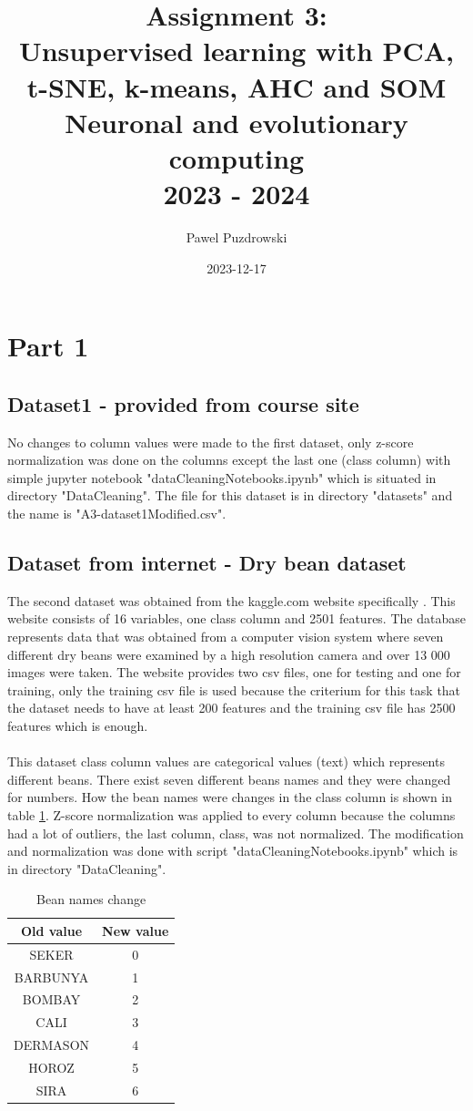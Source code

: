 \documentclass[12pt]{report}
\title{Assignment 3: \\ Unsupervised learning with
	PCA, t-SNE, k-means, AHC and SOM\\ Neuronal and evolutionary computing\\ 2023 - 2024}
\author{Pawel Puzdrowski}
\date{2023-12-17}
\begin{document}
	\maketitle
	\tableofcontents
	\newpage
	\section{Part 1}
	\subsection{Dataset1 - provided from course site}
	No changes to column values were made to the first dataset, only z-score normalization was done on the columns except the last one (class column) with simple jupyter notebook "dataCleaningNotebooks.ipynb" which is situated in directory "DataCleaning". The file for this dataset is in directory "datasets" and the name is "A3-dataset1Modified.csv". 
	\subsection{Dataset from internet - Dry bean dataset}
	The second dataset was obtained from the kaggle.com website specifically \cite{DatasetDryBeans}. This website consists of 16 variables, one class column and 2501 features. The database represents data that was obtained from a computer vision system where seven different dry beans were examined by a high resolution camera and over 13 000 images were taken. The website provides two csv files, one for testing and one for training, only the training csv file is used because the criterium for this task that the dataset needs to have at least 200 features and the training csv file has 2500 features which is enough. \\
	\\
	This dataset class column values are categorical values (text) which represents different beans. There exist seven different beans names and they were changed for numbers. How the bean names were changes in the class column is shown in table \ref{BeanClassChange}. Z-score normalization was applied to every column because the columns had a lot of outliers, the last column, class, was not normalized. The modification and normalization was done with script "dataCleaningNotebooks.ipynb" which is in directory "DataCleaning". 
	\begin{table}[H]
		\centering
		\begin{tabular}{|c|c|}
			\hline
			Old value & New value  \\
			\hline
			SEKER & 0 \\
			\hline
			BARBUNYA & 1 \\
			\hline
			BOMBAY & 2 \\
			\hline
			CALI & 3 \\
			\hline
			DERMASON & 4 \\
			\hline
			HOROZ & 5 \\
			\hline
			SIRA & 6 \\
			\hline
		\end{tabular}
		\caption{Bean names change}
		\label{BeanClassChange}
	\end{table}
	\newpage
\end{document}
